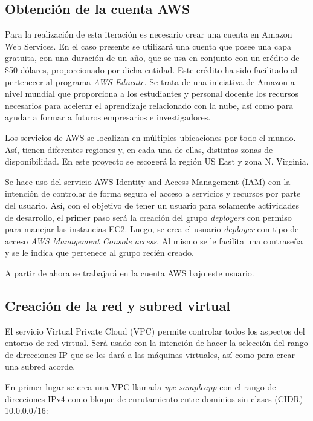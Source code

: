 \subsection{Obtención de la cuenta AWS}

Para la realización de esta iteración es necesario crear una cuenta en Amazon Web Services. En el caso presente se utilizará una cuenta que posee una capa gratuita, con una duración de un año, que se usa en conjunto con un crédito de \$50 dólares, proporcionado por dicha entidad. Este crédito ha sido facilitado al pertenecer al programa \textit{AWS Educate}. Se trata de una iniciativa de Amazon a nivel mundial que proporciona a los estudiantes y personal docente los recursos necesarios para acelerar el aprendizaje relacionado con la nube, así como para ayudar a formar a futuros empresarios e investigadores.

Los servicios de AWS se localizan en múltiples ubicaciones por todo el mundo. Así, tienen diferentes regiones y, en cada una de ellas, distintas zonas de disponibilidad. En este proyecto se escogerá la región US East y zona N. Virginia.

Se hace uso del servicio AWS Identity and Access Management (IAM) con la intención de controlar de forma segura el acceso a servicios y recursos por parte del usuario. Así, con el objetivo de tener un usuario para solamente actividades de desarrollo, el primer paso será la creación del grupo \textit{deployers} con permiso para manejar las instancias EC2. Luego, se crea el usuario \textit{deployer} con tipo de acceso \textit{AWS Management Console access}. Al mismo se le facilita una contraseña y se le indica que pertenece al grupo recién creado.

A partir de ahora se trabajará en la cuenta AWS bajo este usuario.

\subsection{Creación de la red y subred virtual}

El servicio Virtual Private Cloud (VPC) permite controlar todos los aspectos del entorno de red virtual. Será usado con la intención de hacer la selección del rango de direcciones IP que se les dará a las máquinas virtuales, así como para crear una subred acorde.

En primer lugar se crea una VPC llamada \textit{vpc-sampleapp} con el rango de direcciones IPv4 como bloque de enrutamiento entre dominios sin clases (CIDR) 10.0.0.0/16:

